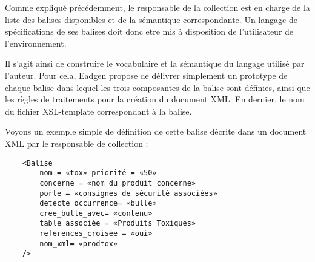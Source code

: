 Comme expliqué précédemment, le responsable de la collection est en
charge de la liste des balises disponibles et de la sémantique
correspondante. Un langage de spécifications de ses balises doit
donc etre mis à disposition de l'utilisateur de l'environnement.

Il s'agit ainsi de construire le vocabulaire et la sémantique
du langage utilisé par l'auteur. Pour cela, Eadgen propose de délivrer
simplement un prototype de chaque balise dans lequel les trois
composantes de la balise sont définies, ainsi que les règles
de traitements pour la création du document XML. En dernier, le
nom du fichier XSL-template correspondant à la balise.

Voyons un exemple simple de définition de cette balise décrite dans un document XML par le responsable de collection :
\begin{verbatim}
	<Balise
		nom = «tox» priorité = «50»
		concerne = «nom du produit concerne»
		porte = «consignes de sécurité associées»
		detecte_occurrence= «bulle»
		cree_bulle_avec= «contenu»
		table_associée = «Produits Toxiques»
		references_croisée = «oui»
		nom_xml= «prodtox»
	/>
\end{verbatim}
